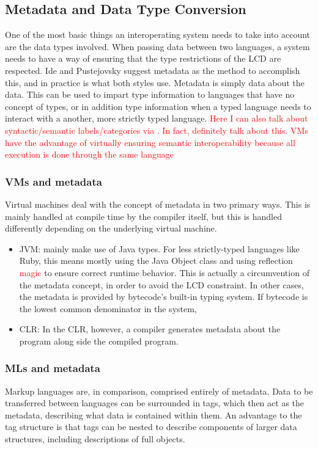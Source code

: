\documentclass{sig-alternate}
\newcommand{\mycomment}[1]{\textcolor{red}{#1}}
\begin{document}
\subsection*{Metadata and Data Type Conversion} \cite{Ide:2010, Bromberg:2011, Hamilton:2003}
One of the most basic things an interoperating system needs to take into account are the data types involved. 
When passing data between two languages, a system needs to have a way of ensuring that the type restrictions of the LCD are respected. Ide and Pustejovsky \cite{Ide:2010} suggest metadata as the method to accomplish this, and in practice is what both styles use. Metadata is simply data about the data. This can be used to impart type information to languages that have no concept of types, or in addition type information when a typed language needs to interact with a another, more strictly typed language.
\mycomment{Here I can also talk about syntactic/semantic labels/categories via \cite{Ide:2010}. In fact, definitely talk about this. VMs have the advantage of virtually ensuring semantic interoperability because all execution is done through the same language}
\subsubsection*{VMs and metadata}
Virtual machines deal with the concept of metadata in two primary ways. This is mainly handled at compile time by the compiler itself, but this is handled differently depending on the underlying virtual machine.
\begin{itemize}
\item JVM: mainly make use of Java types. For less strictly-typed languages like Ruby, this means mostly using the Java Object class and using reflection \mycomment{magic} to ensure correct runtime behavior. This is actually a circumvention of the metadata concept, in order to avoid the LCD constraint. In other cases, the metadata is provided by bytecode's built-in typing system. If bytecode is the lowest common denominator in the system, 
\item CLR: In the CLR, however, a compiler generates metadata about the program along side the compiled program\cite{Hamilton:2003}.
\end{itemize}

\subsubsection*{MLs and metadata}
Markup languages are, in comparison, comprised entirely of metadata. Data to be transferred between languages can be surrounded in tags, which then act as the metadata, describing what data is contained within them. An advantage to the tag structure is that tags can be nested to describe components of larger data structures, including descriptions of full objects. 
\end{document}

